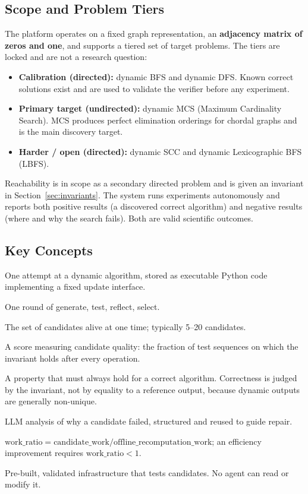 \documentclass[12pt,a4paper]{article}
\begin{document}
\subsection{Scope and Problem Tiers}

The platform operates on a fixed graph representation, an \textbf{adjacency matrix of zeros and one}, and supports a tiered set of target problems. The tiers are locked and are not a research question:

\begin{itemize}[noitemsep]
  \item \textbf{Calibration (directed):} dynamic BFS and dynamic DFS. Known correct solutions exist and are used to validate the verifier before any experiment.
  \item \textbf{Primary target (undirected):} dynamic MCS (Maximum Cardinality Search). MCS produces perfect elimination orderings for chordal graphs \cite{tarjan1984mcs,heggernes2006} and is the main discovery target.
  \item \textbf{Harder / open (directed):} dynamic SCC and dynamic Lexicographic BFS (LBFS).
\end{itemize}

Reachability is in scope as a secondary directed problem and is given an invariant in Section~\ref{sec:invariants}. The system runs experiments autonomously and reports both positive results (a discovered correct algorithm) and negative results (where and why the search fails). Both are valid scientific outcomes.

\subsection{Key Concepts}

\begin{description}[style=nextline, leftmargin=2cm]
  \item[Candidate] One attempt at a dynamic algorithm, stored as executable Python code implementing a fixed update interface.
  \item[Generation] One round of generate, test, reflect, select.
  \item[Population] The set of candidates alive at one time; typically 5--20 candidates.
  \item[Fitness] A score measuring candidate quality: the fraction of test sequences on which the invariant holds after every operation.
  \item[Invariant] A property that must always hold for a correct algorithm. Correctness is judged by the invariant, not by equality to a reference output, because dynamic outputs are generally non-unique.
  \item[Reflection] LLM analysis of why a candidate failed, structured and reused to guide repair.
  \item[Work ratio] $\text{work\_ratio} = \text{candidate\_work} / \text{offline\_recomputation\_work}$; an efficiency improvement requires $\text{work\_ratio} < 1$.
  \item[Trusted verifier] Pre-built, validated infrastructure that tests candidates. No agent can read or modify it.
\end{description}
\end{document}
